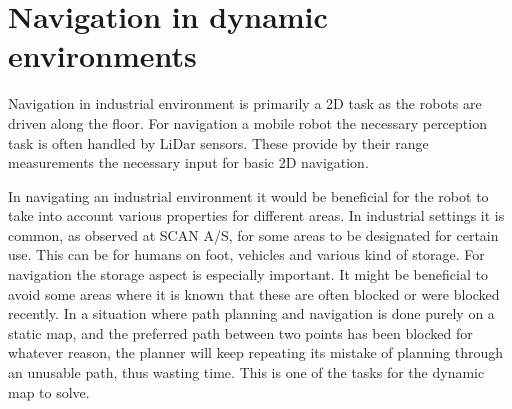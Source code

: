 \section{Navigation in dynamic environments}
Navigation in industrial environment is primarily a 2D task as the robots are driven along the floor. For navigation a mobile robot the necessary perception task is often handled by LiDar sensors. These provide by their range measurements the necessary input for basic 2D navigation. 

In navigating an industrial environment it would be beneficial for the robot to take into account various properties for different areas. In industrial settings it is common, as observed at SCAN A/S, for some areas to be designated for certain use. This can be for humans on foot, vehicles and various kind of storage. For navigation the storage aspect is especially important. It might be beneficial to avoid some areas where it is known that these are often blocked or were blocked recently.
In a situation where path planning and navigation is done purely on a static map, and the preferred path between two points has been blocked for whatever reason, the planner will keep repeating its mistake of planning through an unusable path, thus wasting time. This is one of the tasks for the dynamic map to solve.

